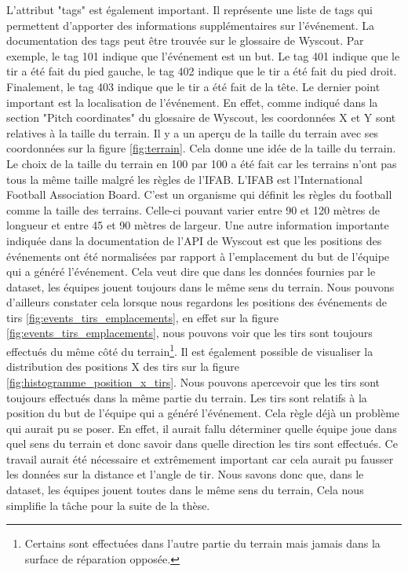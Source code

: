 \documentclass[12pt]{article}
\begin{document}
L'attribut "tags" est également important.
Il représente une liste de tags qui permettent d'apporter des informations supplémentaires sur l'événement.
La documentation des tags peut être trouvée sur le glossaire de Wyscout. \cite{WyscoutGlossary}
Par exemple, le tag 101 indique que l'événement est un but. 
Le tag 401 indique que le tir a été fait du pied gauche, le tag 402 indique que le tir a été fait du pied droit.
Finalement, le tag 403 indique que le tir a été fait de la tête.
\newline\newline
Le dernier point important est la localisation de l'événement.
En effet, comme indiqué dans la section "Pitch coordinates" du glossaire de Wyscout, \cite{WyscoutGlossary} les coordonnées X et Y sont relatives à la taille du terrain.
Il y a un aperçu de la taille du terrain avec ses coordonnées sur la figure \ref{fig:terrain}.
Cela donne une idée de la taille du terrain.
Le choix de la taille du terrain en 100 par 100 a été fait car les terrains n'ont pas tous la même taille malgré les règles de l'IFAB.
\newline\newline
L'IFAB est l'International Football Association Board.
C'est un organisme qui définit les règles du football comme la taille des terrains.
Celle-ci pouvant varier entre 90 et 120 mètres de longueur et entre 45 et 90 mètres de largeur. \cite{TerrainIFAB}
\newline\newline 
Une autre information importante indiquée dans la documentation de l'API de Wyscout \cite{WyscoutAPI} est que les positions des événements ont été normalisées par rapport à l'emplacement du but de l'équipe qui a généré l'événement.
Cela veut dire que dans les données fournies par le dataset, les équipes jouent toujours dans le même sens du terrain.
Nous pouvons d'ailleurs constater cela lorsque nous regardons les positions des événements de tirs \ref{fig:events_tirs_emplacements}, en effet sur la figure \ref{fig:events_tirs_emplacements}, nous pouvons voir que les tirs sont toujours effectués du même côté du terrain\footnote{Certains sont effectuées dans l'autre partie du terrain mais jamais dans la surface de réparation opposée.}.
Il est également possible de visualiser la distribution des positions X des tirs sur la figure \ref{fig:histogramme_position_x_tirs}.
Nous pouvons apercevoir que les tirs sont toujours effectués dans la même partie du terrain.
Les tirs sont relatifs à la position du but de l'équipe qui a généré l'événement.
Cela règle déjà un problème qui aurait pu se poser.
En effet, il aurait fallu déterminer quelle équipe joue dans quel sens du terrain et donc savoir dans quelle direction les tirs sont effectués.
Ce travail aurait été nécessaire et extrêmement important car cela aurait pu fausser les données sur la distance et l'angle de tir.
\newline\newline
Nous savons donc que, dans le dataset, les équipes jouent toutes dans le même sens du terrain, Cela nous simplifie la tâche pour la suite de la thèse.
\end{document}

